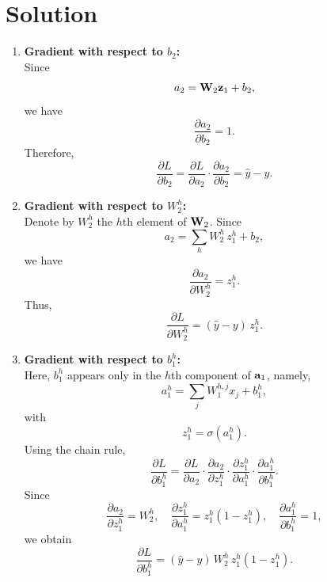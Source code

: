 \documentclass[submit]{../harvardml}
\newenvironment{answer}
  {\section*{Solution}}
{}
\begin{document}
\begin{answer}
\begin{enumerate}
          \begin{enumerate}
            \item \textbf{Gradient with respect to $b_2$:}\\[1mm]
                  Since 
                  \[
                  a_2 = \bold{W}_2\bold{z}_1 + b_2,
                  \]
                  we have
                  \[
                  \frac{\partial a_2}{\partial b_2} = 1.
                  \]
                  Therefore,
                  \[
                  \frac{\partial L}{\partial b_2} = \frac{\partial L}{\partial a_2}\cdot\frac{\partial a_2}{\partial b_2} = \hat{y}-y.
                  \]

            \item \textbf{Gradient with respect to $W_2^h$:}\\[1mm]
                  Denote by $W_2^h$ the $h$th element of $\bold{W}_2$. Since
                  \[
                  a_2 = \sum_{h}W_2^h\,z_1^h + b_2,
                  \]
                  we have
                  \[
                  \frac{\partial a_2}{\partial W_2^h} = z_1^h.
                  \]
                  Thus,
                  \[
                  \frac{\partial L}{\partial W_2^h} = (\hat{y}-y)\,z_1^h.
                  \]

            \item \textbf{Gradient with respect to $b_1^h$:}\\[1mm]
                  Here, $b_1^h$ appears only in the $h$th component of $\bold{a}_1$, namely,
                  \[
                  a_1^h = \sum_{j}W_1^{h,j}x_j + b_1^h,
                  \]
                  with
                  \[
                  z_1^h = \sigma(a_1^h).
                  \]
                  Using the chain rule,
                  \[
                  \frac{\partial L}{\partial b_1^h} = \frac{\partial L}{\partial a_2}\cdot\frac{\partial a_2}{\partial z_1^h}\cdot\frac{\partial z_1^h}{\partial a_1^h}\cdot\frac{\partial a_1^h}{\partial b_1^h}.
                  \]
                  Since
                  \[
                  \frac{\partial a_2}{\partial z_1^h} = W_2^h,\quad \frac{\partial z_1^h}{\partial a_1^h} = z_1^h(1-z_1^h),\quad \frac{\partial a_1^h}{\partial b_1^h} = 1,
                  \]
                  we obtain
                  \[
                  \frac{\partial L}{\partial b_1^h} = (\hat{y}-y)\,W_2^h\,z_1^h(1-z_1^h).
                  \]


\end{enumerate}
\end{enumerate}
\end{answer}
\end{document}

